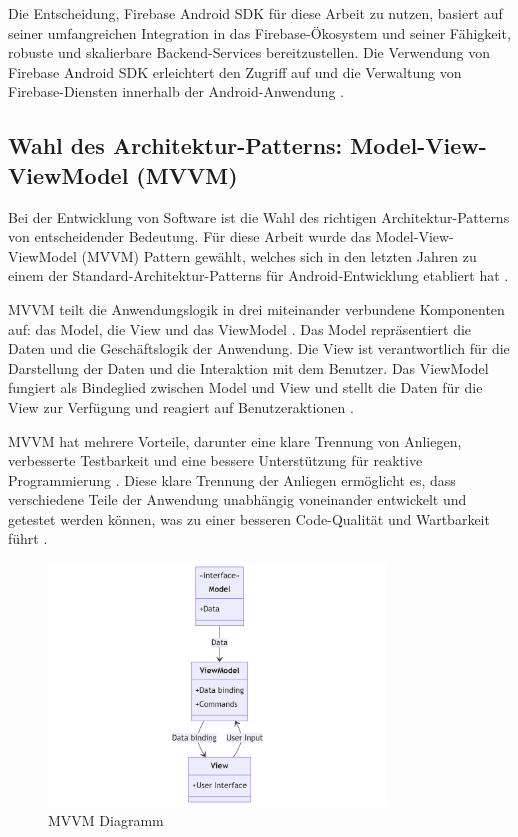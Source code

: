\noindent
Die Entscheidung, Firebase Android SDK für diese Arbeit zu nutzen, basiert auf seiner umfangreichen Integration in das Firebase-Ökosystem und seiner Fähigkeit, robuste und skalierbare Backend-Services bereitzustellen. Die Verwendung von Firebase Android SDK erleichtert den Zugriff auf und die Verwaltung von Firebase-Diensten innerhalb der Android-Anwendung \cite{FirebaseSDK2022}.

\subsection{Wahl des Architektur-Patterns: Model-View-ViewModel (\ac{MVVM})} \label{Wahl des Architektur-Pattern}
Bei der Entwicklung von Software ist die Wahl des richtigen Architektur-Patterns von entscheidender Bedeutung. Für diese Arbeit wurde das Model-View-ViewModel (MVVM) Pattern gewählt, welches sich in den letzten Jahren zu einem der Standard-Architektur-Patterns für Android-Entwicklung etabliert hat \cite{AndroidAppArchitecture}. \newline

\noindent
MVVM teilt die Anwendungslogik in drei miteinander verbundene Komponenten auf: das Model, die View und das ViewModel \cite{MicrosoftMVVM2022}. Das Model repräsentiert die Daten und die Geschäftslogik der Anwendung. Die View ist verantwortlich für die Darstellung der Daten und die Interaktion mit dem Benutzer. Das ViewModel fungiert als Bindeglied zwischen Model und View und stellt die Daten für die View zur Verfügung und reagiert auf Benutzeraktionen \cite{AndroidAppArchitecture}. \newline

\noindent
MVVM hat mehrere Vorteile, darunter eine klare Trennung von Anliegen, verbesserte Testbarkeit und eine bessere Unterstützung für reaktive Programmierung \cite{AndroidAppArchitecture}. Diese klare Trennung der Anliegen ermöglicht es, dass verschiedene Teile der Anwendung unabhängig voneinander entwickelt und getestet werden können, was zu einer besseren Code-Qualität und Wartbarkeit führt \cite{MicrosoftMVVM2022}. \newline
\begin{figure}[h]
    \centering
    \includegraphics[width=0.8\textwidth]{images/diagramme/MVVM.png}
    \caption{MVVM Diagramm}
    \label{fig:mvvm}
\end{figure}
    
